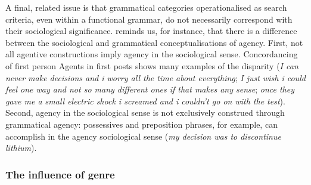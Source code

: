 A final, related issue is that grammatical categories operationalised as search criteria, even within a functional grammar, do not necessarily correspond with their sociological significance. \textcite{van_leeuwen_representation_1996} reminds us, for instance, that there is a difference between the sociological and grammatical conceptualisations of agency. First, not all agentive constructions imply agency in the sociological sense. Concordancing of first person Agents in first \glspl{post} shows many examples of the disparity (\emph{I can never make decisions and i worry all the time about everything}; \emph{I just wish i could feel one way and not so many different ones if that makes any sense}; \emph{once they gave me a small electric shock i screamed and i couldn't go on with the test}). Second, agency in the sociological sense is not exclusively construed through grammatical agency: possessives and preposition phrases, for example, can accomplish in the agency sociological sense (\emph{my decision was to discontinue lithium}). 


\subsubsection{The influence of genre}

